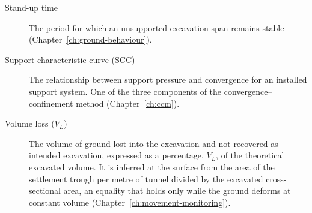 \begin{description}
\item[Stand-up time] The period for which an unsupported excavation span remains stable (Chapter~\ref{ch:ground-behaviour}).
\item[Support characteristic curve (SCC)] The relationship between support pressure and convergence for an installed support system. One of the three components of the convergence--confinement method (Chapter~\ref{ch:ccm}).
\item[Volume loss ($V_L$)] The volume of ground lost into the excavation and not recovered as intended excavation, expressed as a percentage, $V_L$, of the theoretical excavated volume. It is inferred at the surface from the area of the settlement trough per metre of tunnel divided by the excavated cross-sectional area, an equality that holds only while the ground deforms at constant volume (Chapter~\ref{ch:movement-monitoring}).
\end{description}

\chapterreferences
